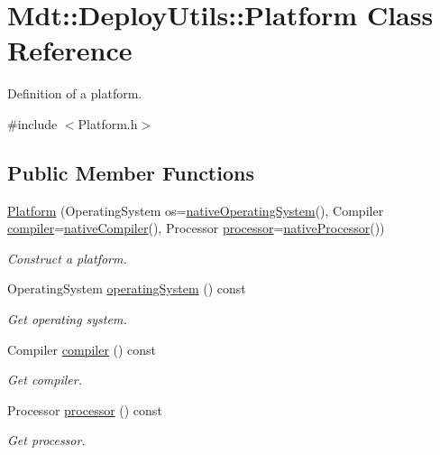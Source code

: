 \hypertarget{class_mdt_1_1_deploy_utils_1_1_platform}{}\section{Mdt\+:\+:Deploy\+Utils\+:\+:Platform Class Reference}
\label{class_mdt_1_1_deploy_utils_1_1_platform}


Definition of a platform.  




{\ttfamily \#include $<$Platform.\+h$>$}

\subsection*{Public Member Functions}
\begin{DoxyCompactItemize}
\item 
\hyperlink{class_mdt_1_1_deploy_utils_1_1_platform_a1d0bfc4226c34681de02fb71bdf21ab1}{Platform} (Operating\+System os=\hyperlink{class_mdt_1_1_deploy_utils_1_1_platform_aa9c466ca43cea94e751b73f8270fe4bb}{native\+Operating\+System}(), Compiler \hyperlink{class_mdt_1_1_deploy_utils_1_1_platform_a453beb4e9409bc5c1473ffae3f211dc0}{compiler}=\hyperlink{class_mdt_1_1_deploy_utils_1_1_platform_aeca6535d32ac63294f3f8dfcb9b996a7}{native\+Compiler}(), Processor \hyperlink{class_mdt_1_1_deploy_utils_1_1_platform_a5f94968dbefcbe843b503fae9afb9ce6}{processor}=\hyperlink{class_mdt_1_1_deploy_utils_1_1_platform_afcf216e9f71ad3df91588dd1e96e05ee}{native\+Processor}())
\begin{DoxyCompactList}\small\item\em Construct a platform. \end{DoxyCompactList}\item 
Operating\+System \hyperlink{class_mdt_1_1_deploy_utils_1_1_platform_a564312f1a3df51c9028ba35e05fb4c45}{operating\+System} () const 
\begin{DoxyCompactList}\small\item\em Get operating system. \end{DoxyCompactList}\item 
Compiler \hyperlink{class_mdt_1_1_deploy_utils_1_1_platform_a453beb4e9409bc5c1473ffae3f211dc0}{compiler} () const 
\begin{DoxyCompactList}\small\item\em Get compiler. \end{DoxyCompactList}\item 
Processor \hyperlink{class_mdt_1_1_deploy_utils_1_1_platform_a5f94968dbefcbe843b503fae9afb9ce6}{processor} () const 
\begin{DoxyCompactList}\small\item\em Get processor. \end{DoxyCompactList}\end{DoxyCompactItemize}
